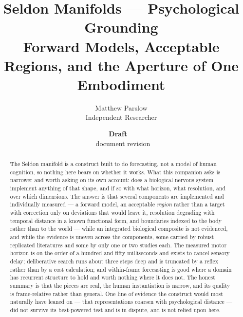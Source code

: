 \documentclass[11pt,a4paper]{article}
\title{Seldon Manifolds --- Psychological Grounding\\\large Forward Models, Acceptable Regions, and the Aperture of One Embodiment}
\author{Matthew Parslow\\Independent Researcher}
\date{\textbf{Draft \texorpdfstring{\textemdash}{---}\ \PaperDraft}\\[2pt]\PaperDisplayDate \texorpdfstring{\textbullet}{\textperiodcentered}\ document revision \PaperRevision}
\theoremstyle{remark}
\begin{document}
\maketitle
\begin{center}
\end{center}
\vspace{1em}

\begin{abstract}
The Seldon manifold is a construct built to do forecasting, not a model of human cognition, so
nothing here bears on whether it works. What this companion asks is narrower and worth asking on
its own account: does a biological nervous system implement anything of that shape, and if so with
what horizon, what resolution, and over which dimensions. The answer is that several components are
implemented and individually measured --- a forward model, an acceptable \emph{region} rather than a target
with correction only on deviations that would leave it, resolution degrading with temporal distance
in a known functional form, and boundaries indexed to the body rather than to the world --- while
an integrated biological composite is not evidenced, and while the evidence is uneven across the components, some carried by robust
replicated literatures and some by only one or two studies each. The measured motor horizon is on the order of a hundred and fifty
milliseconds and exists to cancel sensory delay; deliberative search runs about three steps deep and
is truncated by a reflex rather than by a cost calculation; and within-frame forecasting is good
where a domain has recurrent structure to hold and worth nothing where it does not. The honest
summary is that the pieces are real, the human instantiation is narrow, and its quality is
frame-relative rather than general. One line of evidence the construct would most naturally have
leaned on --- that representations coarsen with psychological distance --- did not survive its
best-powered test and is in dispute, and is not relied upon here.
\end{abstract}
\end{document}
